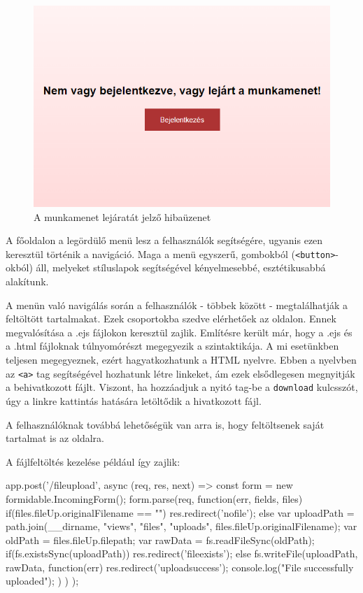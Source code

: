 \begin{figure}[h]
	\centering
		\includegraphics[width=10truecm, height=7truecm]{images/lejart_munkamenet.png}
	\caption{A munkamenet lejáratát jelző hibaüzenet}
	\label{fig:invalid}
\end{figure}

A főoldalon a legördülő menü lesz a felhasználók segítségére, ugyanis ezen keresztül történik a navigáció. Maga a menü egyszerű, gombokból (\texttt{<button>}-okból) áll, melyeket stíluslapok segítségével kényelmesebbé, esztétikusabbá alakítunk.

A menün való navigálás során a felhasználók - többek között - megtalálhatják a feltöltött tartalmakat. Ezek csoportokba szedve elérhetőek az oldalon. Ennek megvalósítása a .ejs fájlokon keresztül zajlik. Említésre került már, hogy a .ejs és a .html fájloknak túlnyomórészt megegyezik a szintaktikája. A mi esetünkben teljesen megegyeznek, ezért hagyatkozhatunk a HTML nyelvre. Ebben a nyelvben az \texttt{<a>} tag segítségével hozhatunk létre linkeket, ám ezek elsődlegesen megnyitják a behivatkozott fájlt. Viszont, ha hozzáadjuk a nyitó tag-be a \texttt{download} kulcsszót, úgy a linkre kattintás hatására letöltődik a hivatkozott fájl.

A felhasználóknak továbbá lehetőségük van arra is, hogy feltöltsenek saját tartalmat is az oldalra.

A fájlfeltöltés kezelése például így zajlik:

\begin{javascript}
app.post('/fileupload', async (req, res, next) => {
  const form = new formidable.IncomingForm();
  form.parse(req, function(err, fields, files){
    if(files.fileUp.originalFilename == ""){
      res.redirect('nofile');
    }
    else{
      var uploadPath = path.join(__dirname, "views", "files",
"uploads", files.fileUp.originalFilename);
      var oldPath = files.fileUp.filepath;
      var rawData = fs.readFileSync(oldPath);
      if(fs.existsSync(uploadPath)){
        res.redirect('fileexists');
      }
      else{
        fs.writeFile(uploadPath, rawData, function(err){
          res.redirect('uploadsuccess');
          console.log("File successfully uploaded");
        })
      }
    }
  })
});
\end{javascript}

